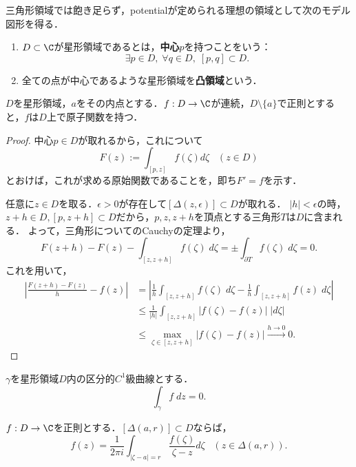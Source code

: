 \documentclass[uplatex, dvipdfmx]{jsreport}
\begin{document}
三角形領域では飽き足らず，potentialが定められる理想の領域として次のモデル図形を得る．
\begin{definition}\mbox{}
    \begin{enumerate}
        \item $D\subset\C$が星形領域であるとは，\textbf{中心}$p$を持つことをいう：
        \[ \exists p\in D,\;\forall q\in D,\;[p,q]\subset D. \]
        \item 全ての点が中心であるような星形領域を\textbf{凸領域}という．
    \end{enumerate}
\end{definition}

\begin{theorem}[potentialの構成]
    $D$を星形領域，$a$をその内点とする．$f:D\to\C$が連続，$D\setminus\{a\}$で正則とすると，$f$は$D$上で原子関数を持つ．
\end{theorem}
\begin{proof}
    中心$p\in D$が取れるから，これについて
    \[ F(z):=\int_{[p,z]}f(\zeta)d\zeta\;\;\;(z\in D) \]
    とおけば，これが求める原始関数であることを，即ち$F'=f$を示す．

    任意に$z\in D$を取る．$\epsilon>0$が存在して$[\Delta(z,\epsilon)]\subset D$が取れる．
    $|h|<\epsilon$の時，$z+h\in D,[p,z+h]\subset D$だから，$p,z,z+h$を頂点とする三角形$T$は$D$に含まれる．
    よって，三角形についてのCauchyの定理より，
    \[ F(z+h)-F(z)-\int_{[z,z+h]}f(\zeta)\;d\zeta = \pm\int_{\partial T}f(\zeta)\;d\zeta=0. \]
    これを用いて，
    \begin{align*}
        \left| \frac{F(z+h)-F(z)}{h} - f(z) \right| &= \left| \frac{1}{h}\int_{[z,z+h]}f(\zeta)\;d\zeta-\frac{1}{h}\int_{[z,z+h]}f(z)\;d\zeta \right|\\
        &\le \frac{1}{|h|}\int_{[z,z+h]}|f(\zeta)-f(z)|\;|d\zeta|\\
        &\le \max_{\zeta\in[z,z+h]}|f(\zeta)-f(z)|\xrightarrow{h\to 0}0.
    \end{align*}
\end{proof}

\begin{corollary}\label{cor-Cauchy's-theorem}
    $\gamma$を星形領域$D$内の区分的$C^1$級曲線とする．
    \[ \int_{\gamma}f\;dz=0. \]
\end{corollary}

\begin{theorem}[$C^1$級を仮定しないCauchyの積分表示]\label{thm-Cauchy's-integral-expression}
    $f:D\to\C$を正則とする．$[\Delta(a,r)]\subset D$ならば，
    \[ f(z)=\frac{1}{2\pi i}\int_{|\zeta-a|=r}\frac{f(\zeta)}{\zeta-z}d\zeta\;\;\;(z\in\Delta(a,r)). \]
\end{theorem}
\end{document}
